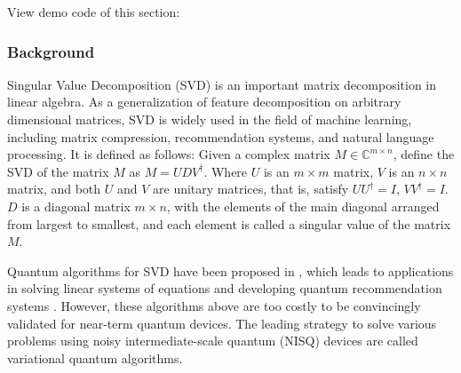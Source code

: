 View demo code of this section: 

\subsubsection{Background}
Singular Value Decomposition (SVD) is an important matrix decomposition in linear algebra. As a generalization of feature decomposition on arbitrary dimensional matrices, SVD is widely used in the field of machine learning, including matrix compression, recommendation systems, and natural language processing. It is defined as follows:
Given a complex matrix $M \in \mathbb{C}^{m \times n}$, define the SVD of the matrix $M$ as $M = UDV^\dagger$. Where $U$ is an $m \times m$ matrix, $V$ is an $n \times n$ matrix, and both $U$ and $V$ are unitary matrices, that is, satisfy $UU^\dagger = I$, $VV^\dagger = I$. $D$ is a diagonal matrix $m \times n$, with the elements of the main diagonal arranged from largest to smallest, and each element is called a singular value of the matrix $M$.


Quantum algorithms for SVD have been proposed in \cite{kerenidis2016quantum, rebentrost2018quantum}, which leads to applications in solving linear systems of equations \cite{wossnig2018quantum} and developing quantum recommendation systems \cite{kerenidis2016quantum}. However, these algorithms above are too costly to be convincingly validated for near-term quantum devices. The leading strategy to solve various problems using noisy intermediate-scale quantum (NISQ) devices are called variational quantum algorithms.

